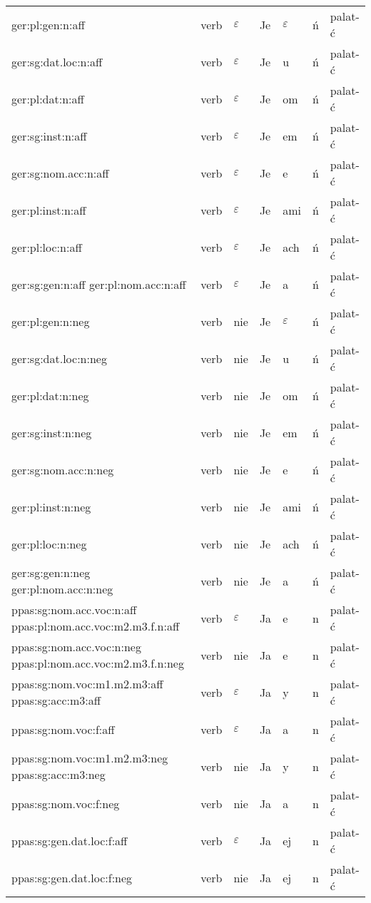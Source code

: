 \documentclass{article}
\begin{document}
\begin{longtable}{p{7cm}|l|l|l|l|l|l}
ger:pl:gen:n:aff & verb & $\varepsilon$ & Je & $\varepsilon$ & ń & palat-ć\\
ger:sg:dat.loc:n:aff & verb & $\varepsilon$ & Je & u & ń & palat-ć\\
ger:pl:dat:n:aff & verb & $\varepsilon$ & Je & om & ń & palat-ć\\
ger:sg:inst:n:aff & verb & $\varepsilon$ & Je & em & ń & palat-ć\\
ger:sg:nom.acc:n:aff & verb & $\varepsilon$ & Je & e & ń & palat-ć\\
ger:pl:inst:n:aff & verb & $\varepsilon$ & Je & ami & ń & palat-ć\\
ger:pl:loc:n:aff & verb & $\varepsilon$ & Je & ach & ń & palat-ć\\
ger:sg:gen:n:aff ger:pl:nom.acc:n:aff & verb & $\varepsilon$ & Je & a & ń & palat-ć\\
ger:pl:gen:n:neg & verb & nie & Je & $\varepsilon$ & ń & palat-ć\\
ger:sg:dat.loc:n:neg & verb & nie & Je & u & ń & palat-ć\\
ger:pl:dat:n:neg & verb & nie & Je & om & ń & palat-ć\\
ger:sg:inst:n:neg & verb & nie & Je & em & ń & palat-ć\\
ger:sg:nom.acc:n:neg & verb & nie & Je & e & ń & palat-ć\\
ger:pl:inst:n:neg & verb & nie & Je & ami & ń & palat-ć\\
ger:pl:loc:n:neg & verb & nie & Je & ach & ń & palat-ć\\
ger:sg:gen:n:neg ger:pl:nom.acc:n:neg & verb & nie & Je & a & ń & palat-ć\\
ppas:sg:nom.acc.voc:n:aff ppas:pl:nom.acc.voc:m2.m3.f.n:aff & verb & $\varepsilon$ & Ja & e & n & palat-ć\\
ppas:sg:nom.acc.voc:n:neg ppas:pl:nom.acc.voc:m2.m3.f.n:neg & verb & nie & Ja & e & n & palat-ć\\
ppas:sg:nom.voc:m1.m2.m3:aff ppas:sg:acc:m3:aff & verb & $\varepsilon$ & Ja & y & n & palat-ć\\
ppas:sg:nom.voc:f:aff & verb & $\varepsilon$ & Ja & a & n & palat-ć\\
ppas:sg:nom.voc:m1.m2.m3:neg ppas:sg:acc:m3:neg & verb & nie & Ja & y & n & palat-ć\\
ppas:sg:nom.voc:f:neg & verb & nie & Ja & a & n & palat-ć\\
ppas:sg:gen.dat.loc:f:aff & verb & $\varepsilon$ & Ja & ej & n & palat-ć\\
ppas:sg:gen.dat.loc:f:neg & verb & nie & Ja & ej & n & palat-ć\\

\end{longtable}
\end{document}

